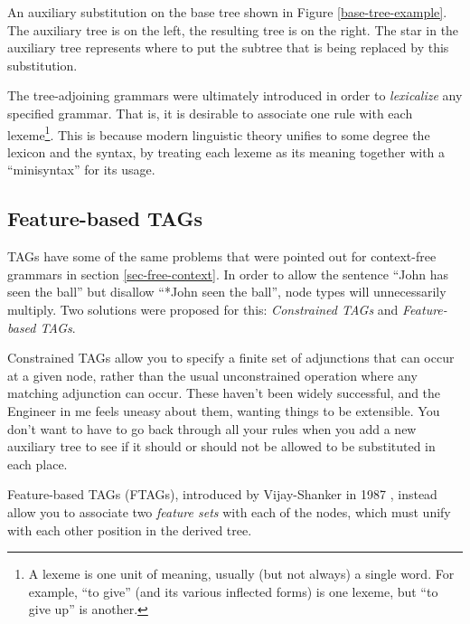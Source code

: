 \documentclass[12pt]{article}
\newcommand{\defn}[1]{\textit{#1}}
\begin{document}
\begin{Figure}
\begin{center}
\end{center}
\caption{An auxiliary substitution on the base tree shown in Figure
\ref{base-tree-example}.  The auxiliary tree is on the left, the
resulting tree is on the right.  The star in the auxiliary tree
represents where to put the subtree that is being replaced by this
substitution.}
\label{adjoining-substitution}
\end{Figure}

The tree-adjoining grammars were ultimately introduced in order to
\defn{lexicalize} any specified grammar.  That is, it is desirable to
associate one rule with each lexeme\footnote{A lexeme is one unit of
meaning, usually (but not always) a single word.  For example, ``to
give'' (and its various inflected forms) is one lexeme, but ``to give
up'' is another.}.  This is because modern linguistic theory unifies to
some degree the lexicon and the syntax, by treating each lexeme as its
meaning together with a ``minisyntax'' for its usage.

\subsection{Feature-based TAGs}

TAGs have some of the same problems that were pointed out for
context-free grammars in section \ref{sec-free-context}.  In order to
allow the sentence ``John has seen the ball'' but disallow ``*John seen
the ball'', node types will unnecessarily multiply.  Two solutions were
proposed for this: \defn{Constrained TAGs} and \defn{Feature-based
TAGs}.

Constrained TAGs allow you to specify a finite set of adjunctions that
can occur at a given node, rather than the usual unconstrained operation
where any matching adjunction can occur.  These haven't been widely
successful, and the Engineer in me feels uneasy about them, wanting
things to be extensible.  You don't want to have to go back through all
your rules when you add a new auxiliary tree to see if it should or
should not be allowed to be substituted in each place.

Feature-based TAGs (FTAGs), introduced by Vijay-Shanker in 1987
\cite{Vijay-Shanker-1987}, instead allow you to associate two
\defn{feature sets} with each of the nodes, which must unify with each
other position in the derived tree.
\end{document}
